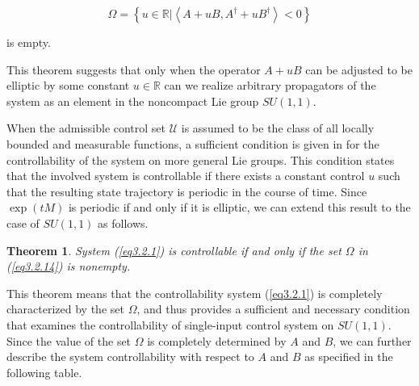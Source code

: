 \documentclass[onecolumn,showpacs,showkeys,preprintnumbers]{revtex4}
\newtheorem{theorem}{Theorem}[section]
\begin{document}
\noindent\begin{equation}\label{eq3.2.14}
\Omega=\left\{u\in\mathbb{R}|\left<A+uB,A^{\dag}+uB^{\dag}\right><0\right\}
\end{equation}

\noindent is empty.

This theorem suggests that only when the operator $A+uB$ can be
adjusted to be elliptic by some constant $u\in\mathbb{R}$ can we
realize arbitrary propagators of the system as an element in the
noncompact Lie group $SU(1,1)$.

When the admissible control set $\mathcal{U}$ is assumed to be the
class of all locally bounded and measurable functions, a
sufficient condition is given in \cite{Jurdjevic1} for the
controllability of the system on more general Lie groups. This
condition states that the involved system is controllable if there
exists a constant control $u$ such that the resulting state
trajectory is periodic in the course of time. Since $\exp(tM)$ is
periodic if and only if it is elliptic, we can extend this result
to the case of $SU(1,1)$ as follows.

\noindent\begin{theorem}\label{theorem3.2.4}System (\ref{eq3.2.1}) is controllable if and only if the set
$\Omega$ in (\ref{eq3.2.14}) is nonempty.
\end{theorem}

This theorem means that the controllability system (\ref{eq3.2.1})
is completely characterized by the set $\Omega$, and thus provides
a sufficient and necessary condition that examines the
controllability of single-input control system on $SU(1,1)$. Since
the value of the set $\Omega$ is completely determined by $A$ and
$B$, we can further describe the system controllability with
respect to $A$ and $B$ as specified in the following table.
\end{document}
